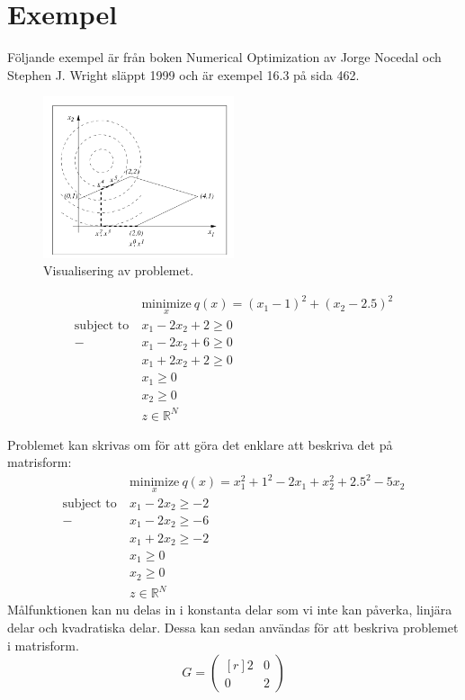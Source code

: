 \section{Exempel}
Följande exempel är från boken Numerical Optimization av Jorge Nocedal och Stephen J. Wright släppt 1999 och är exempel 16.3 på sida 462.
\begin{figure}[h!]
  \centering
    \includegraphics[width=0.5\textwidth]{grafik/exempel.png}
      \caption{Visualisering av problemet.}
\end{figure}

\begin{equation*}
\begin{aligned}
& \underset{x}{\text{minimize}}\
  q(x)=  (x_1-1)^2+(x_2-2.5)^2\\
 \text{subject to}\
 & x_1-2x_2+2 \geq0  \\
 -& x_1-2x_2+6 \geq0  \\
 & x_1+2x_2+2 \geq0  \\
 & x_1\geq0  \\
 & x_2\geq0  \\
 & z \in \mathbb{R}^N 
\end{aligned}
\end{equation*}

Problemet kan skrivas om för att göra det enklare att beskriva det på matrisform:
\begin{equation*}
\begin{aligned}
& \underset{x}{\text{minimize}}\
  q(x)=  x_1^2+1^2-2x_1+x_2^2 +2.5^2-5x_ 2\\
 \text{subject to}\
 & x_1-2x_2 \geq-2  \\
 -& x_1-2x_2 \geq-6  \\
 & x_1+2x_2 \geq-2  \\
 & x_1\geq0  \\
 & x_2\geq0  \\
 & z \in \mathbb{R}^N 
\end{aligned}
\end{equation*}
Målfunktionen kan nu delas in i konstanta delar som vi inte kan påverka, linjära delar och kvadratiska delar.
Dessa kan sedan användas för att beskriva problemet i matrisform.
 \[
 G=
\begin{pmatrix*}[r]
  2 & 0 \\
  0 & 2
\end{pmatrix*}
\]
 
